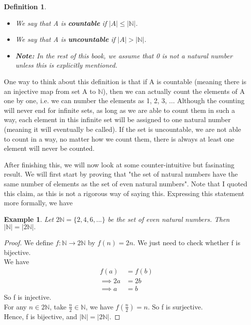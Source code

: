 \documentclass{book}
\newtheorem{definition}[theorem]{Definition}
\newtheorem{example}[theorem]{Example}
\begin{document}
\begin{definition}
    \begin{itemize}[itemsep = 0pt]
        \item[(1)] We say that A is \textbf{countable} if $|A| \leq |\mathbb{N}|$.
        \item[(2)] We say that A is \textbf{uncountable} if $|A| > |\mathbb{N}|$.
        \item[(3)] \textbf{Note:} In the rest of this book, we assume that 0 is not a natural number unless this is explicitly mentioned.
    \end{itemize}
\end{definition}

One way to think about this definition is that if A is countable (meaning there is an injective map from set A to $\mathbb{N}$), then we can actually count the elements of A one by one, i.e. we can number the elements as 1, 2, 3, ... Although the counting will never end for infinite sets, as long as we are able to count them in such a way, each element in this infinite set will be assigned to one natural number (meaning it will eventually be called). If the set is uncountable, we are not able to count in a way, no matter how we count them, there is always at least one element will never be counted.

After finishing this, we will now look at some counter-intuitive but fasinating result. We will first start by proving that "the set of natural numbers have the same number of elements as the set of even natural numbers". Note that I quoted this claim, as this is not a rigorous way of saying this. Expressing this statement more formally, we have

\begin{example}
    Let $2 \mathbb{N} = \{2, 4, 6, ...\}$ be the set of even natural numbers. Then $|\mathbb{N}| = |2 \mathbb{N}|.$
\end{example}

\begin{proof}
    We define $f : \mathbb{N} \rightarrow 2 \mathbb{N}$ by $f(n) = 2n$. We just need to check whether f is bijective. \\
    We have
    \begin{align*}
        f(a) & = f(b) \\
        \implies 2a & = 2b \\
        \implies a & = b
    \end{align*}
    So f is injective. \\
    For any $n \in 2 \mathbb{N}$, take $\frac{n}{2} \in \mathbb{N}$, we have $f\left(\frac{n}{2}\right) = n.$ So f is surjective. \\
    Hence, f is bijective, and $|\mathbb{N}| = |2 \mathbb{N}|$.
\end{proof}
\end{document}
